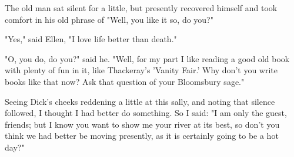 The old man sat silent for a little, but presently recovered himself and
took comfort in his old phrase of "Well, you like it so, do you?"

"Yes," said Ellen, "I love life better than death."

"O, you do, do you?" said he. "Well, for my part I like reading a good
old book with plenty of fun in it, like Thackeray's 'Vanity Fair.' Why
don't you write books like that now? Ask that question of your
Bloomsbury sage."

Seeing Dick's cheeks reddening a little at this sally, and noting that
silence followed, I thought I had better do something. So I said: "I am
only the guest, friends; but I know you want to show me your river at
its best, so don't you think we had better be moving presently, as it is
certainly going to be a hot day?"
